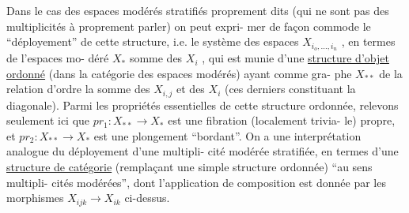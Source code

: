 
Dans le cas des espaces modérés stratifiés proprement dits (qui
ne sont pas des multiplicités à proprement parler) on peut expri-%
mer de façon commode le ``déployement'' de cette structure, i.e.
le système des espaces $X_{i_o,\ldots,i_n}$ , en termes de l'espaces mo-%
déré $X_*$ somme des $X_i$ , qui est munie d'une \uline{structure d'objet}
\uline{ordonné} (dans la catégorie des espaces modérés) ayant comme gra-%
phe $X_{**}$ de la relation d'ordre la somme des $X_{i,j}$ et des $X_i$
(ces derniers constituant la diagonale). Parmi les propriétés
essentielles de cette structure ordonnée, relevons seulement
ici que $pr_1 : X_{**} \longrightarrow X_*$ est une fibration (localement trivia-%
le) propre, et $pr_2 : X_{**} \longrightarrow X_*$ est une plongement ``bordant''.
On a une interprétation analogue du déployement d'une multipli-%
cité modérée stratifiée, en termes d'une \uline{structure de catégorie}
(remplaçant une simple structure ordonnée) ``au sens multipli-%
cités modérées'', dont l'application de composition est donnée
par les morphismes $X_{ijk} \longrightarrow X_{ik}$ ci-dessus.

